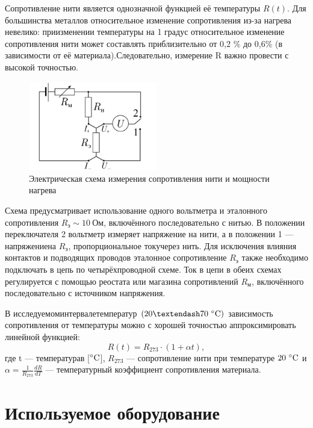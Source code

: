 \documentclass[a4paper, 12pt]{article}
\begin{document}
Сопротивление нити является однозначной функцией её температуры $R(t)$. Для большинства металлов относительное изменение сопротивления из-за нагрева невелико: приизменении температуры на 1 градус относительное изменение сопротивления нити может составлять приблизительно от 0,2 \% до 0,6\% (в зависимости от её материала).Следовательно, измерение R важно провести с высокой точностью.

\begin{figure}
\includegraphics[width=0.5\textwidth]{2.png}
\caption{Электрическая схема измерения сопротивления нити и мощности нагрева}
\label{ris2}
\end{figure}

Схема предусматривает использование одного вольтметра и эталонного сопротивления $R_э\sim10 \: Ом$, включённого последовательно с нитью. В положении переключателя 2 вольтметр измеряет напряжение на нити, а в положении 1 — напряжениена $R_э$, пропорциональное токучерез нить. Для исключения влияния контактов и подводящих проводов эталонное сопротивление $R_э$ также   необходимо подключать в цепь по четырёхпроводной схеме.
Ток в цепи в обеих схемах регулируется с помощью реостата или магазина сопротивлений $R_м$, включённого последовательно с источником напряжения.

В исследуемоминтервалетемператур $(20–70~\celsius)$ зависимость сопротивления  от температуры можно с хорошей точностью аппроксимировать линейной функцией:
\begin{equation}\label{6}
	R(t) = R_{273} \cdot (1+\alpha t),
\end{equation}
где t — температурав [$\celsius$], $R_{273}$ — сопротивление нити при температуре $20~\celsius$ и \\ $\alpha = \frac{1}{R_{273}}\frac{dR}{dT}$ — температурный коэффициент сопротивления материала.


\section{Используемое оборудование}
\end{document}
